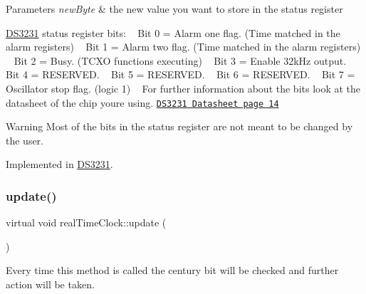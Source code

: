 \begin{DoxyParams}{Parameters}
{\em new\+Byte} & the new value you want to store in the status register\\
\hline
\end{DoxyParams}
\mbox{\hyperlink{class_d_s3231}{D\+S3231}} status register bits\+: ~\newline
 Bit 0 = Alarm one flag. (Time matched in the alarm registers) ~\newline
 Bit 1 = Alarm two flag. (Time matched in the alarm registers) ~\newline
 Bit 2 = Busy. (T\+C\+XO functions executing) ~\newline
 Bit 3 = Enable 32k\+Hz output. ~\newline
 Bit 4 = R\+E\+S\+E\+R\+V\+ED. ~\newline
 Bit 5 = R\+E\+S\+E\+R\+V\+ED. ~\newline
 Bit 6 = R\+E\+S\+E\+R\+V\+ED. ~\newline
 Bit 7 = Oscillator stop flag. (logic 1) ~\newline
 For further information about the bits look at the datasheet of the chip you\textquotesingle{}re using. \href{https://datasheets.maximintegrated.com/en/ds/DS3231.pdf}{\tt D\+S3231 Datasheet page 14} \begin{DoxyWarning}{Warning}
Most of the bits in the status register are not meant to be changed by the user. 
\end{DoxyWarning}


Implemented in \mbox{\hyperlink{class_d_s3231_a303a9a5123f66987e209396d60e329e8}{D\+S3231}}.

\mbox{\label{classreal_time_clock_afb5132ca3cbe80552a88041cead0a2b3}} 
\subsubsection{\texorpdfstring{update()}{update()}}
{\footnotesize\ttfamily virtual void real\+Time\+Clock\+::update (\begin{DoxyParamCaption}{ }\end{DoxyParamCaption})\hspace{0.3cm}{\ttfamily [pure virtual]}}



Every time this method is called the century bit will be checked and further action will be taken. 

